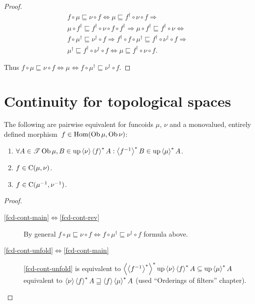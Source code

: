 \begin{proof}
\begin{multline*}
f \circ \mu \sqsubseteq \nu \circ f \Leftrightarrow \mu
\sqsubseteq f^{\dagger} \circ \nu \circ f \Rightarrow \\ \mu \circ
f^{\dagger} \sqsubseteq f^{\dagger} \circ \nu \circ f \circ f^{\dagger}
\Rightarrow \mu \circ f^{\dagger} \sqsubseteq f^{\dagger} \circ \nu
\Leftrightarrow \\ f \circ \mu^{\dagger} \sqsubseteq \nu^{\dagger} \circ f
\Rightarrow f^{\dagger} \circ f \circ \mu^{\dagger} \sqsubseteq
f^{\dagger} \circ \nu^{\dagger} \circ f \Rightarrow \\ \mu^{\dagger}
\sqsubseteq f^{\dagger} \circ \nu^{\dagger} \circ f \Leftrightarrow \mu
\sqsubseteq f^{\dagger} \circ \nu \circ f.
\end{multline*}

Thus $f \circ \mu \sqsubseteq \nu \circ f \Leftrightarrow \mu \Leftrightarrow
f \circ \mu^{\dagger} \sqsubseteq \nu^{\dagger} \circ f$.
\end{proof}

\section{Continuity for topological spaces}

\begin{prop}
  The following are pairwise equivalent for funcoids $\mu$, $\nu$ and
  a monovalued, entirely defined morphism~$f\in\operatorname{Hom}(\operatorname{Ob}\mu,\operatorname{Ob}\nu)$:
  \begin{enumerate}
    \item\label{fcd-cont-unfold} $\forall A \in \mathscr{T} \operatorname{Ob} \mu, B \in \operatorname{up}
    \left\langle \nu\right\rangle \left\langle f\right\rangle ^{\ast} A : \left\langle f^{- 1}\right\rangle ^{\ast}
    B \in \operatorname{up} \left\langle \mu\right\rangle ^{\ast} A$.

    \item\label{fcd-cont-main}  $f \in \mathrm{C} (\mu, \nu)$.

    \item\label{fcd-cont-rev} $f \in \mathrm{C} (\mu^{- 1} , \nu^{- 1})$.
  \end{enumerate}
\end{prop}

\begin{proof}
  ~
  \begin{description}
  \item[\ref{fcd-cont-main}$\Leftrightarrow$\ref{fcd-cont-rev}] By general $f \circ \mu \sqsubseteq \nu \circ
  f \Leftrightarrow f \circ \mu^{\dagger} \sqsubseteq \nu^{\dagger}
  \circ f$ formula above.

  \item[\ref{fcd-cont-unfold}$\Leftrightarrow$\ref{fcd-cont-main}] \ref{fcd-cont-unfold} is equivalent to
  $\left\langle \left\langle f^{- 1}\right\rangle ^{\ast}\right\rangle ^{\ast}
  \operatorname{up} \left\langle \nu\right\rangle \left\langle f\right\rangle ^{\ast} A \subseteq \operatorname{up}
  \left\langle \mu\right\rangle ^{\ast} A$ equivalent to $\left\langle \nu\right\rangle \left\langle f\right\rangle ^{\ast}
  A \sqsupseteq \left\langle f\right\rangle \left\langle \mu\right\rangle ^{\ast} A$
  (used ``Orderings of filters'' chapter).
  \end{description}
\end{proof}

